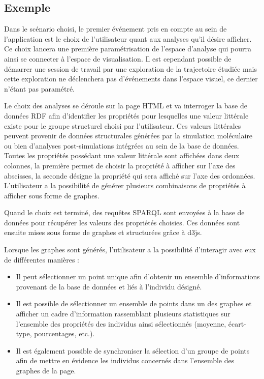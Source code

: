 \subsection{Exemple}

Dans le scénario choisi, le premier événement pris en compte au sein de l'application est le choix de l'utilisateur quant aux analyses qu'il désire afficher. Ce choix lancera une première paramétrisation de l'espace d'analyse qui pourra ainsi se connecter à l'espace de visualisation. 
Il est cependant possible de démarrer une session de travail par une exploration de la trajectoire étudiée mais cette exploration ne déclenchera pas d'événements dans l'espace visuel, ce dernier n'étant pas paramétré.

Le choix des analyses se déroule sur la page HTML et va interroger la base de données RDF afin d'identifier les propriétés pour lesquelles une valeur littérale existe pour le groupe structurel choisi par l'utilisateur. 
Ces valeurs littérales peuvent provenir de données structurales générées par la simulation moléculaire ou bien d'analyses post-simulations intégrées au sein de la base de données. 
Toutes les propriétés possédant une valeur littérale sont affichées dans deux colonnes, la première permet de choisir la propriété à afficher sur l'axe des abscisses, la seconde désigne la propriété qui sera affiché sur l'axe des ordonnées. 
L'utilisateur a la possibilité de générer plusieurs combinaisons de propriétés à afficher sous forme de graphes. 

Quand le choix est terminé, des requêtes SPARQL sont envoyées à la base de données pour récupérer les valeurs des propriétés choisies. Ces données sont ensuite mises sous forme de graphes et structurées grâce à d3js.

Lorsque les graphes sont générés, l'utilisateur a la possibilité d'interagir avec eux de différentes manières : 
\begin{itemize}
  \item Il peut sélectionner un point unique afin d'obtenir un ensemble d'informations provenant de la base de données et liés à l'individu désigné.
  \item Il est possible de sélectionner un ensemble de points dans un des graphes et afficher un cadre d'information rassemblant plusieurs statistiques sur l'ensemble des propriétés des individus ainsi sélectionnés (moyenne, écart-type, pourcentages, etc.).
  \item Il est également possible de synchroniser la sélection d'un groupe de points afin de mettre en évidence les individus concernés dans l'ensemble des graphes de la page.
\end{itemize}

